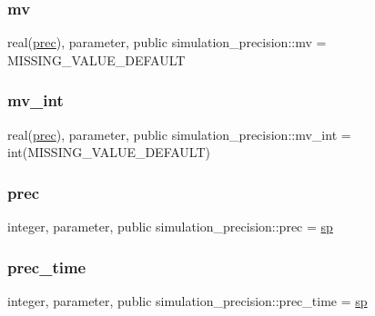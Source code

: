 \subsubsection{\texorpdfstring{mv}{mv}}
{\footnotesize\ttfamily real(\hyperlink{namespacesimulation__precision_a6d3bcd3b4ff2cfb92ec9fe36ecad405b}{prec}), parameter, public simulation\+\_\+precision\+::mv = M\+I\+S\+S\+I\+N\+G\+\_\+\+V\+A\+L\+U\+E\+\_\+\+D\+E\+F\+A\+U\+LT}

\mbox{\label{namespacesimulation__precision_ae23a853ee1499839ea702b3c01e443fc}} 
\subsubsection{\texorpdfstring{mv\+\_\+int}{mv\_int}}
{\footnotesize\ttfamily real(\hyperlink{namespacesimulation__precision_a6d3bcd3b4ff2cfb92ec9fe36ecad405b}{prec}), parameter, public simulation\+\_\+precision\+::mv\+\_\+int = int(M\+I\+S\+S\+I\+N\+G\+\_\+\+V\+A\+L\+U\+E\+\_\+\+D\+E\+F\+A\+U\+LT)}

\mbox{\label{namespacesimulation__precision_a6d3bcd3b4ff2cfb92ec9fe36ecad405b}} 
\subsubsection{\texorpdfstring{prec}{prec}}
{\footnotesize\ttfamily integer, parameter, public simulation\+\_\+precision\+::prec = \hyperlink{namespacesimulation__precision_a3657003647318cfe37c797ab37448a2e}{sp}}

\mbox{\label{namespacesimulation__precision_a09a1db15abeed81ff2f54b363128ffed}} 
\subsubsection{\texorpdfstring{prec\+\_\+time}{prec\_time}}
{\footnotesize\ttfamily integer, parameter, public simulation\+\_\+precision\+::prec\+\_\+time = \hyperlink{namespacesimulation__precision_a3657003647318cfe37c797ab37448a2e}{sp}}

